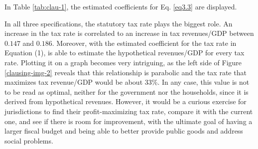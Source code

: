 In Table \ref{tab:clau-1}, the estimated coefficients for Eq. \ref{eq3.3} are displayed.
\begin{table}[ht]
\centering
\captionsetup{font=small}\caption{regression results, \textcite{clausing}}
\label{tab:clau-1}
\vspace{-2pt}
\end{table}
In all three specifications, the statutory tax rate plays the biggest role. An increase in the tax rate is correlated to an increase in tax revenues/GDP between $0.147$ and $0.186$. Moreover, with the estimated coefficient for the tax rate in Equation (1), \textcite{clausing} is able to estimate the hypothetical revenues/GDP for every tax rate. Plotting it on a graph becomes very intriguing, as the left side of Figure \ref{clausing-img-2} reveals that this relationship is parabolic and the tax rate that maximizes tax revenue/GDP would be about 33\%. In any case, this value is not to be read as optimal, neither for the government nor the households, since it is derived from hypothetical revenues. However, it would be a curious exercise for jurisdictions to find their profit-maximizing tax rate, compare it with the current one, and see if there is room for improvement, with the ultimate goal of having a larger fiscal budget and being able to better provide public goods and address social problems.
